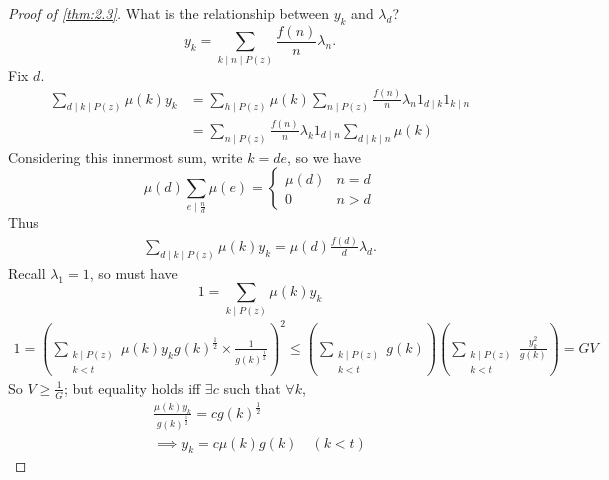 \documentclass{article}
\newcommand{\1}{\mathbbm{1}}
\begin{document}
\begin{proof}[Proof of \cref{thm:2.3}]
  What is the relationship between $y_k$ and $\lambda_d$?
  \begin{equation*}
    y_k = \sum_{k \mid n \mid P(z)} \frac{f(n)}{n} \lambda_n.
  \end{equation*}
  Fix $d$.
  \begin{align*}
    \sum_{d \mid k \mid P(z)} \mu(k) y_k &= \sum_{h \mid P(z)} \mu(k) \sum_{n \mid P(z)} \frac{f(n)}{n} \lambda_n 1_{d \mid k} 1_{k \mid n} \\
                                         &= \sum_{n \mid P(z)} \frac{f(n)}{n} \lambda_{k} 1_{d \mid n} \sum_{d \mid k \mid n} \mu(k)
  \end{align*}
  Considering this innermost sum, write $k = de$, so we have
  \begin{equation*}
    \mu(d) \sum_{e \mid \frac{n}{d}} \mu(e) =
    \begin{cases}
      \mu(d) & n = d \\
      0 & n > d
    \end{cases}
  \end{equation*}
  Thus
  \begin{align*}
    \sum_{d \mid k \mid P(z)} \mu(k) y_k = \mu(d) \frac{f(d)}{d} \lambda_d.
  \end{align*}
  Recall $\lambda_1=1$, so must have
  \begin{equation*}1 = \sum_{k \mid P(z)} \mu(k) y_k\end{equation*}
  \begin{align*}
    1 = \left(\sum_{\substack{k \mid P(z) \\ k < t}} \mu(k) y_k g(k)^{\frac 12} \times \frac{1}{g(k)^{\frac 12}}\right)^2 \leq \left(\sum_{\substack{k \mid P(z) \\ k<t}} g(k)\right) \left(\sum_{\substack{k \mid P(z) \\ k < t}} \frac{y_k^2}{g(k)}\right) = GV
  \end{align*}
  So $V \geq \frac{1}{G}$; but equality holds iff $\exists c$ such that $\forall k$,
  \begin{align*}
    \frac{\mu(k) y_k}{g(k)^{\frac{1}{2}}} = c g(k)^{\frac 12} \\
    \implies y_k = c \mu(k) g(k) \quad (k < t)
  \end{align*}


\end{proof}
\end{document}
